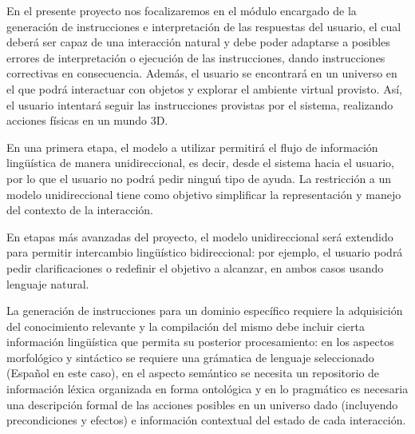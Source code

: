 

En el presente proyecto nos focalizaremos en el  m\'odulo encargado de la generaci\'on de  instrucciones e interpretaci\'on de las respuestas del usuario, el cual deber\'a ser capaz de una interacci\'on natural y debe poder adaptarse a posibles errores de interpretaci\'on o ejecuci\'on de las instrucciones, dando instrucciones correctivas en consecuencia. Adem\'as, el usuario se encontrar\'a en un universo en el que podr\'a interactuar con objetos y explorar el ambiente virtual provisto. As\'i, el usuario intentar\'a seguir las instrucciones provistas por el sistema,
realizando acciones f\'isicas en un mundo 3D.

En una primera etapa, el modelo a utilizar permitir\'a el flujo de informaci\'on ling\"u\'istica de manera unidireccional, es decir,
desde el sistema hacia el usuario, por lo que
el usuario no podr\'a pedir ningu\'n tipo de ayuda.  La restricci\'on a un
modelo unidireccional tiene como objetivo
simplificar la representaci\'on y manejo del contexto de la interacci\'on.

En etapas m\'as avanzadas del proyecto, el modelo unidireccional ser\'a extendido para
permitir intercambio ling\"u\'istico bidireccional: por ejemplo, el usuario podr\'a
pedir clarificaciones o redefinir el objetivo a alcanzar, en ambos casos usando lenguaje natural.

La generaci\'on de instrucciones para un dominio espec\'ifico requiere la adquisici\'on del conocimiento relevante y la compilaci\'on del mismo debe incluir cierta informaci\'on  ling\"u\'istica que permita su posterior procesamiento: en los aspectos morfol\'ogico y sint\'actico se requiere una gr\'amatica de lenguaje seleccionado (Espa\~nol en este caso), en el aspecto sem\'antico se necesita un repositorio de informaci\'on l\'exica organizada en forma ontol\'ogica y en lo pragm\'atico es necesaria una descripci\'on formal de las
acciones posibles en un universo dado (incluyendo precondiciones y efectos) e informaci\'on contextual del estado de cada interacci\'on.

